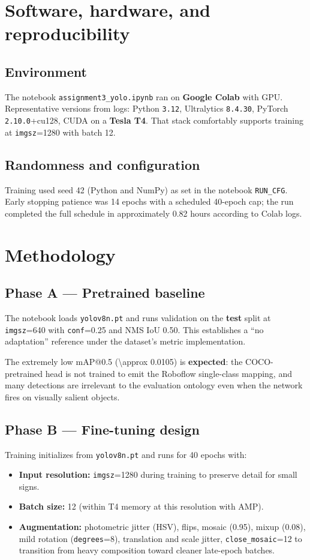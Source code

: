 \documentclass[11pt,a4paper]{article}
\begin{document}
\section{Software, hardware, and reproducibility}

\subsection{Environment}
The notebook \texttt{assignment3\_yolo.ipynb} ran on \textbf{Google Colab} with GPU. Representative versions from logs: Python \texttt{3.12}, Ultralytics \texttt{8.4.30}, PyTorch \texttt{2.10.0}+cu128, CUDA on a \textbf{Tesla T4}. That stack comfortably supports training at \texttt{imgsz}=\num{1280} with batch \num{12}.

\subsection{Randomness and configuration}
Training used seed \num{42} (Python and NumPy) as set in the notebook \texttt{RUN\_CFG}. Early stopping patience was \num{14} epochs with a scheduled \num{40}-epoch cap; the run completed the full schedule in approximately \num{0.82} hours according to Colab logs.

\section{Methodology}

\subsection{Phase A --- Pretrained baseline}
The notebook loads \texttt{yolov8n.pt} and runs validation on the \textbf{test} split at \texttt{imgsz}=\num{640} with \texttt{conf}=\num{0.25} and NMS IoU \num{0.50}. This establishes a ``no adaptation'' reference under the dataset's metric implementation.

The extremely low mAP@0.5 (\num{\approx 0.0105}) is \textbf{expected}: the COCO-pretrained head is not trained to emit the Roboflow single-class mapping, and many detections are irrelevant to the evaluation ontology even when the network fires on visually salient objects.

\subsection{Phase B --- Fine-tuning design}
Training initializes from \texttt{yolov8n.pt} and runs for \num{40} epochs with:
\begin{itemize}[leftmargin=*]
  \item \textbf{Input resolution:} \texttt{imgsz}=\num{1280} during training to preserve detail for small signs.
  \item \textbf{Batch size:} \num{12} (within T4 memory at this resolution with AMP).
  \item \textbf{Augmentation:} photometric jitter (HSV), flips, mosaic (\num{0.95}), mixup (\num{0.08}), mild rotation (\texttt{degrees}=\num{8}), translation and scale jitter, \texttt{close\_mosaic}=\num{12} to transition from heavy composition toward cleaner late-epoch batches.
\end{itemize}
\end{document}
